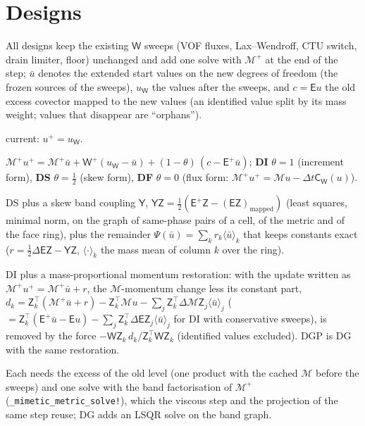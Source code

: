 \documentclass[11pt,a4paper]{article}
\newcommand{\code}[1]{\texttt{#1}}
\newcommand{\dt}{\Delta t}
\newcommand{\MM}{\mathcal M}
\newcommand{\W}{\mathsf W}
\newcommand{\E}{\mathsf E}
\newcommand{\Z}{\mathsf Z}
\newcommand{\C}{\mathsf C}
\newcommand{\Y}{\mathsf Y}
\newcommand{\ubar}{\bar u}
\begin{document}
\section{Designs}\label{sec:designs}
All designs keep the existing $\W$ sweeps (VOF fluxes, Lax--Wendroff, CTU switch, drain
limiter, floor) unchanged and add one solve with $\MM^+$ at the end of the step; $\ubar$
denotes the extended start values on the new degrees of freedom (the frozen sources of the
sweeps), $u_\W$ the values after the sweeps, and $c=\E u$ the old excess covector mapped
to the new values (an identified value split by its mass weight; values that disappear are
``orphans'').
\begin{description}[leftmargin=1.1cm,style=nextline,itemsep=2pt]
\item[D0] current: $u^+=u_\W$.
\item[D$\theta$] $\MM^+u^+=\MM^+\ubar+\W^+(u_\W-\ubar)+(1-\theta)\,(c-\E^+\ubar)$;
  \textbf{DI} $\theta=1$ (increment form), \textbf{DS} $\theta=\tfrac12$ (skew form),
  \textbf{DF} $\theta=0$ (flux form: $\MM^+u^+=\MM u-\dt\C_\W(u)$).
\item[DG] DS plus a skew band coupling $\Y$, $\Y\Z=\tfrac12(\E^+\Z-(\E\Z)_{\text{mapped}})$
  (least squares, minimal norm, on the graph of same-phase pairs of a cell, of the metric
  and of the face ring), plus the remainder $\Psi(\ubar)=\sum_k r_k\langle\ubar\rangle_k$ that
  keeps constants exact ($r=\tfrac12\Delta\E\Z-\Y\Z$, $\langle\cdot\rangle_k$ the mass mean of
  column $k$ over the ring).
\item[DP] DI plus a mass-proportional momentum restoration: with the update written as
  $\MM^+u^+=\MM^+\ubar+r$, the $\MM$-momentum change less its constant part,
  $d_k=\Z_k^\top(\MM^+\ubar+r)-\Z_k^\top\MM u-\sum_j\Z_k^\top\Delta\MM\Z_j\langle\ubar\rangle_j$
  ($=\Z_k^\top(\E^+\ubar-\E u)-\sum_j\Z_k^\top\Delta\E\Z_j\langle\ubar\rangle_j$ for DI with conservative
  sweeps), is removed by the force $-\W\Z_k\,d_k/\Z_k^\top\W\Z_k$ (identified values excluded).
  DGP is DG with the same restoration.
\end{description}
Each needs the excess of the old level (one product with the cached $\MM$ before the
sweeps) and one solve with the band factorisation of $\MM^+$ (\code{\_mimetic\_metric\_solve!}),
which the viscous step and the projection of the same step reuse; DG adds an LSQR solve on
the band graph.
\end{document}
